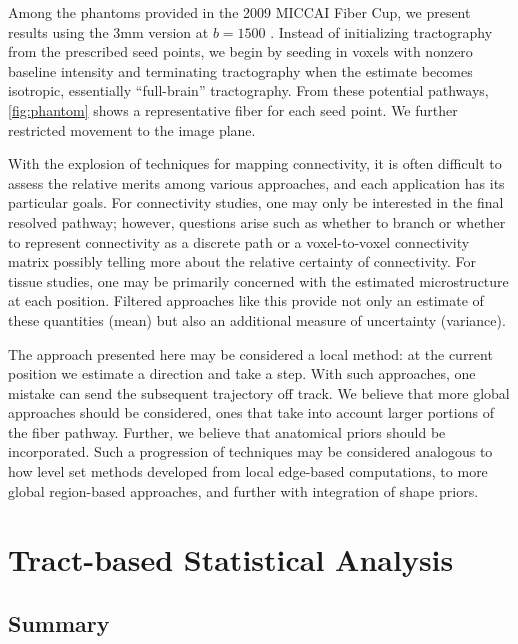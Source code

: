 \documentclass[final,hyperref]{gatech-thesis}
\newcommand{\bn}[1]{\ensuremath{b\!=\!#1}\xspace}
\begin{document}
Among the phantoms provided in the 2009 MICCAI Fiber Cup, we present results
using the 3mm version at \bn{1500} \cite{Poupon2008phantom}.  Instead of
initializing tractography from the prescribed seed points, we begin by seeding
in voxels with nonzero baseline intensity and terminating tractography when
the estimate becomes isotropic, essentially ``full-brain'' tractography.  From
these potential pathways, \autoref{fig:phantom} shows a representative fiber
for each seed point.  We further restricted movement to the image plane.

With the explosion of techniques for mapping connectivity, it is often
difficult to assess the relative merits among various approaches, and each
application has its particular goals.
%
For connectivity studies, one may only be interested in the final resolved
pathway; however, questions arise such as whether to branch or whether to
represent connectivity as a discrete path or a voxel-to-voxel connectivity
matrix possibly telling more about the relative certainty of connectivity.
%
For tissue studies, one may be primarily concerned with the estimated
microstructure at each position.  Filtered approaches like this provide not
only an estimate of these quantities (mean) but also an additional measure of
uncertainty (variance).

The approach presented here may be considered a local method: at the current
position we estimate a direction and take a step.  With such approaches, one
mistake can send the subsequent trajectory off track.  We believe that more
global approaches should be considered, ones that take into account larger
portions of the fiber pathway.  Further, we believe that anatomical priors
should be incorporated.  Such a progression of techniques may be considered
analogous to how level set methods developed from local edge-based
computations, to more global region-based approaches, and further with
integration of shape priors.



\chapter{Tract-based Statistical Analysis}

\section{Summary}
\end{document}
